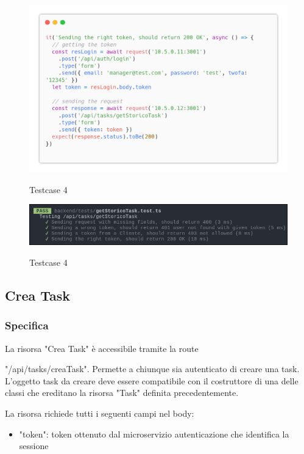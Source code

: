 \documentclass{report}
\begin{document}
\begin{figure}[H]
	\centering\includegraphics[width=1\textwidth]{images/code_storico_test4.png}
	
	Testcase 4
\end{figure}

\begin{figure}[H]
	\centering\includegraphics[width=1\textwidth]{images/jest_storico.png}
	
	Testcase 4
\end{figure}


\subsection{Crea Task}
\subsubsection*{Specifica}

La risorsa "Crea Task" è accessibile tramite la route

"/api/tasks/creaTask". Permette a chiunque sia autenticato di creare una task. L'oggetto task da creare deve essere compatibile con il costruttore di una delle classi che ereditano la risorsa "Task" definita precedentemente.

La risorsa richiede tutti i seguenti campi nel body:
\begin{itemize}
	\item "token": token ottenuto dal microservizio autenticazione che identifica la sessione
\end{itemize}
\end{document}
